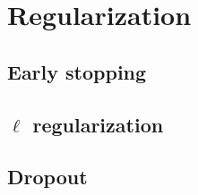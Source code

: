 \section{Regularization}

\subsection{Early stopping}
\subsection{$\ell$ regularization}
\subsection{Dropout}
